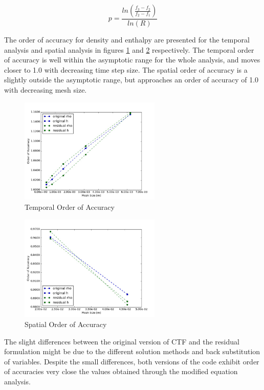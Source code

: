 \documentclass{mc2015}
\begin{document}
\begin{equation}
	\label{eq:OOA}
	p= \frac{
	      	ln \left(
	      	\frac{f_{3}-f_{2}}{f_{2}-f_{1}}
	      	\right)
	    }{ln(R)}
\end{equation}

The order of accuracy for density and enthalpy are presented for the temporal
analysis and spatial analysis in figures \ref{fig:Temporal:OOA} and
\ref{fig:Spatial:OOA} respectively. The temporal order of accuracy is well
within the asymptotic range for the whole analysis, and moves closer to 1.0 with
decreasing time step size. The spatial order of accuracy is a slightly outside
the asymptotic range, but approaches an order of accuracy of 1.0 with
decreasing mesh size. 

\begin{figure}[!h]
	\centering
	\includegraphics[width=0.60\textwidth]{images/Temporal_Study/Order_Of_Accuracy_Summary}
	\caption{Temporal Order of Accuracy}
	\label{fig:Temporal:OOA}
\end{figure}

\begin{figure}[!h]
	\centering
	\includegraphics[width=0.60\textwidth]{images/Spatial_Study/Order_Of_Accuracy_Summary}
	\caption{Spatial Order of Accuracy}
	\label{fig:Spatial:OOA}
\end{figure}

The slight differences between the original version of CTF and the residual
formulation might be due to the different solution methods and back substitution
of variables. Despite the small differences, both versions of the code exhibit
order of accuracies very close the values obtained through the modified
equation analysis.
\end{document}

